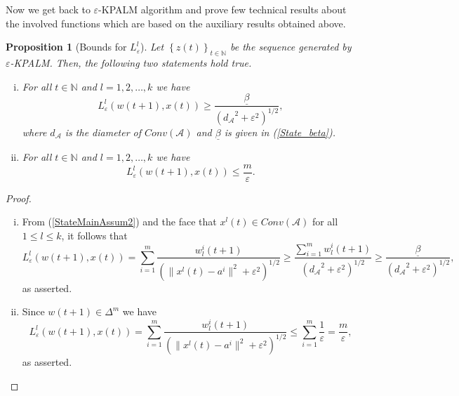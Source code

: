 \documentclass[11pt]{article}
\numberwithin{equation}{section}
\newtheorem{proposition}{Proposition}[section]
\begin{document}
Now we get back to $\varepsilon$-KPALM algorithm and prove few technical results about the involved functions which are based on the auxiliary results obtained above.

\begin{proposition}[Bounds for $L^l_{\varepsilon}$] \label{State_L_bounds}
Let $\left\lbrace z(t) \right\rbrace_{t \in \mathbb{N}}$ be the sequence generated by $\varepsilon$-KPALM. Then, the following two statements hold true.
\begin{enumerate}[(i)]
	\item For all $t \in \mathbb{N}$ and $l=1,2, \ldots, k$ we have
	\begin{equation*}
		L^l_{\varepsilon}(w(t+1),x(t)) \geq \frac{\underline{\beta}}{\left( {d_{\mathcal{A}}}^2 + {\varepsilon}^2 \right)^{1/2}} ,
	\end{equation*}
	where $d_{\mathcal{A}}$ is the diameter of $Conv(\mathcal{A})$ and $\underline{\beta}$ is given in (\ref{State_beta}). \label{State_L_bounds1}
	\item For all $t \in \mathbb{N}$ and $l=1,2, \ldots, k$ we have
	\begin{equation*}
		L^l_{\varepsilon}(w(t+1),x(t)) \leq \frac{m}{\varepsilon} .
	\end{equation*} \label{State_L_bounds2}
\end{enumerate}
\end{proposition}

\begin{proof}
\begin{enumerate}[(i)]
	\item From (\ref{StateMainAssum2}) and the face that $x^l(t) \in Conv(\mathcal{A})$ for all $1 \leq l \leq k$, it follows that
	\begin{equation*}
		L^l_{\varepsilon}(w(t+1),x(t)) = \sum\limits_{i=1}^{m} \frac{w^i_l(t+1)}{\left( \|x^l(t) - a^i\|^2 + {\varepsilon}^2 \right)^{1/2}} \geq \frac{\sum_{i=1}^{m}w^i_l(t+1)}{\left( {d_{\mathcal{A}}}^2 + {\varepsilon}^2 \right)^{1/2}} \geq \frac{\underline{\beta}}{\left( {d_{\mathcal{A}}}^2 + {\varepsilon}^2 \right)^{1/2}} ,
	\end{equation*}
	as asserted. 
	\item Since $w(t+1) \in {\Delta}^m$ we have
	\begin{equation*}
		L^l_{\varepsilon}(w(t+1),x(t)) = \sum\limits_{i=1}^{m} \frac{w^i_l(t+1)}{\left( \|x^l(t) - a^i\|^2 + {\varepsilon}^2 \right)^{1/2}} \leq \sum\limits_{i=1}^{m} \frac{1}{\varepsilon} = \frac{m}{\varepsilon} ,
	\end{equation*}
	as asserted.
\end{enumerate}
\end{proof}
\end{document}
